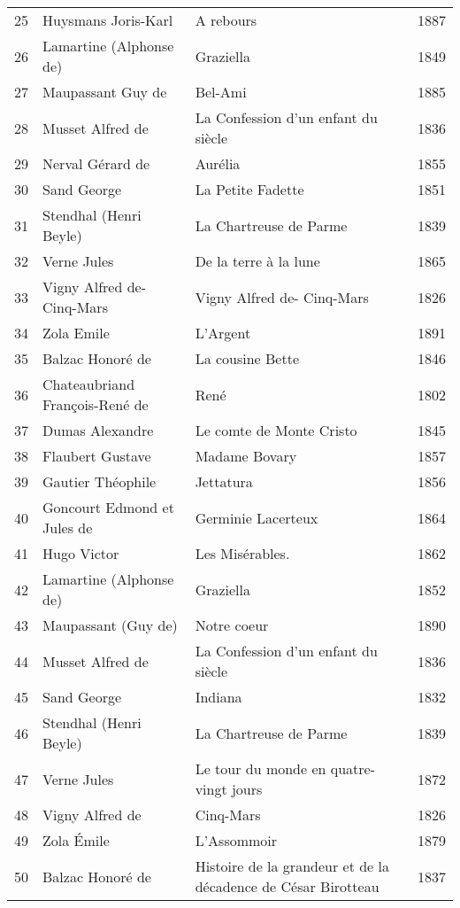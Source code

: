 \begin{table}
\begin{tabular}{l l l l}
    25 & Huysmans Joris-Karl & A rebours & 1887 \\
    26 & Lamartine (Alphonse de) & Graziella & 1849 \\
    27 & Maupassant Guy de & Bel-Ami & 1885 \\
    28 & Musset Alfred de & La Confession d’un enfant du siècle & 1836 \\
    29 & Nerval Gérard de & Aurélia & 1855 \\
    30 & Sand George & La Petite Fadette & 1851 \\
    31 & Stendhal (Henri Beyle) & La Chartreuse de Parme & 1839 \\
    32 & Verne Jules & De la terre à la lune & 1865 \\
    33 & Vigny Alfred de- Cinq-Mars & Vigny Alfred de- Cinq-Mars & 1826 \\
    34 & Zola Emile & L'Argent & 1891 \\
    35 & Balzac Honoré de & La cousine Bette & 1846 \\
    36 & Chateaubriand François-René de & René & 1802 \\
    37 & Dumas Alexandre & Le comte de Monte Cristo & 1845 \\
    38 & Flaubert Gustave & Madame Bovary & 1857 \\
    39 & Gautier Théophile & Jettatura & 1856 \\
    40 & Goncourt Edmond et Jules de & Germinie Lacerteux & 1864 \\
    41 & Hugo Victor & Les Misérables. & 1862 \\
    42 & Lamartine (Alphonse de) & Graziella & 1852 \\
    43 & Maupassant (Guy de) & Notre coeur & 1890 \\
    44 & Musset Alfred de & La Confession d’un enfant du siècle & 1836 \\
    45 & Sand George & Indiana & 1832 \\
    46 & Stendhal (Henri Beyle) & La Chartreuse de Parme & 1839 \\
    47 & Verne Jules & Le tour du monde en quatre-vingt jours & 1872 \\
    48 & Vigny Alfred de & Cinq-Mars & 1826 \\
    49 & Zola Émile & L’Assommoir & 1879 \\
    50 & Balzac Honoré de & Histoire de la grandeur et de la décadence de César Birotteau & 1837 \\
    \bottomrule
  \end{tabular}
\end{table}


